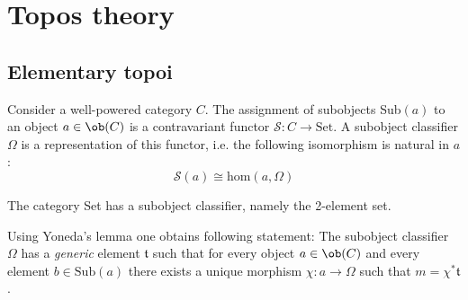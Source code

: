 \chapter{Topos theory}

\section{Elementary topoi}

	\begin{adefinition}
		Consider a well-powered category $C$. The assignment of subobjects Sub$(a)$ to an object $a\in\ob(C)$ is a contravariant functor $\mathcal{S}:C\rightarrow\text{Set}$. A subobject classifier $\Omega$ is a representation of this functor, i.e. the following isomorphism is natural in $a$:
		\begin{equation}
			\mathcal{S}(a)\cong\text{hom}(a, \Omega)
		\end{equation}
	\end{adefinition}
	
	\begin{example}
		The category Set has a subobject classifier, namely the 2-element set.
	\end{example}
	
	\begin{property}
		Using Yoneda's lemma one obtains following statement: The subobject classifier $\Omega$ has a \textit{generic} element $\mathfrak{t}$ such that for every object $a\in\ob(C)$ and every element $b\in\text{Sub}(a)$ there exists a unique morphism $\chi:a\rightarrow\Omega$ such that $m = \chi^*\mathfrak{t}$.
	\end{property}

